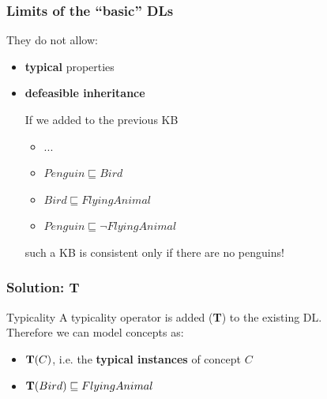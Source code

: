 \documentclass[serif,mathserif]{beamer}
\newcommand{\tip}{{\bf T}}
\begin{document}
\begin{frame}
	\frametitle{Limits of the ``basic'' DLs}
	They do not allow:
	\begin{itemize}
	\item \textbf{typical} properties
	\item \textbf{defeasible inheritance}
	
	\begin{example}
	If we added to the previous KB
	\begin{itemize}
		\item ...
		\item $Penguin \sqsubseteq Bird$
		\item \alert{$Bird \sqsubseteq FlyingAnimal$}
		\item \alert{$Penguin \sqsubseteq \neg FlyingAnimal$}
	\end{itemize}
	such a KB is consistent only if there are no penguins!
	\end{example}
	
%	
	\end{itemize}
\end{frame}

\begin{frame}
	\frametitle{Solution: \tip}
	
	\begin{block}{Typicality}
	A typicality operator is added (\tip) to the existing DL.\\
	Therefore we can model concepts as:
	\begin{itemize}
	\item $\tip(C)$, i.e. the \textbf{typical instances} of concept $C$\\
	\end{itemize}
	\end{block}
	
	\begin{example}
	\begin{itemize}
	\item $\tip(Bird) \sqsubseteq FlyingAnimal$
	\end{itemize}
	\end{example}
\end{frame}
\end{document}
